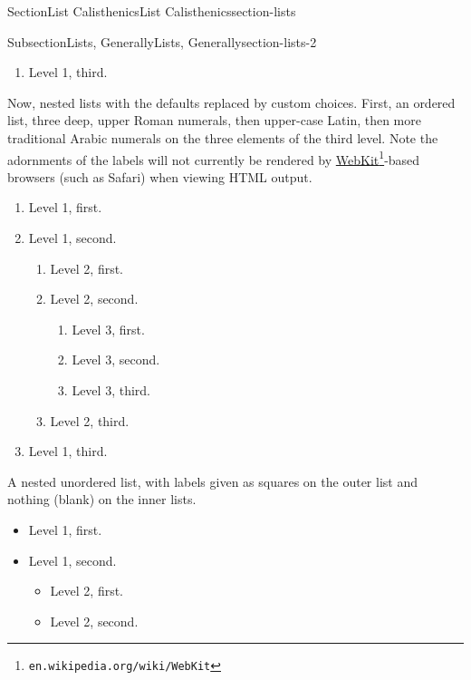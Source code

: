 \documentclass[twoside,10pt,]{article}
\numberwithin{equation}{section}
\begin{document}
\begin{sectionptx}{Section}{List Calisthenics}{}{List Calisthenics}{}{}{section-lists}
\begin{subsectionptx}{Subsection}{Lists, Generally}{}{Lists, Generally}{}{}{section-lists-2}
\begin{enumerate}
\begin{enumerate}
\begin{itemize}[label=\textbullet]
\begin{enumerate}
\begin{enumerate}
\end{enumerate}
%
\item{}Level 4, third.%
\end{enumerate}
%
\item{}Level 3, third.%
\end{itemize}
%
\item{}Level 2, third.%
\end{enumerate}
%
\item{}Level 1, third.%
\end{enumerate}
%
\par
Now, nested lists with the defaults replaced by custom choices.  First, an ordered list, three deep, upper Roman numerals, then upper-case Latin, then more traditional Arabic numerals on the three elements of the third level.  Note the adornments of the labels will not currently be rendered by \href{https://en.wikipedia.org/wiki/WebKit}{WebKit}\footnote{\nolinkurl{en.wikipedia.org/wiki/WebKit}\label{section-lists-2-13-2}}-based browsers (such as Safari) when viewing HTML output.%
\begin{enumerate}[label={*\Roman**}]
\item{}Level 1, first.%
\item{}Level 1, second.%
\begin{enumerate}[label={++\Alph*}]
\item{}Level 2, first.%
\item{}Level 2, second.%
\begin{enumerate}[label={\arabic*)}]
\item{}Level 3, first.%
\item{}Level 3, second.%
\item{}Level 3, third.%
\end{enumerate}
%
\item{}Level 2, third.%
\end{enumerate}
%
\item{}Level 1, third.%
\end{enumerate}
%
\par
A nested unordered list, with labels given as squares on the outer list and nothing (blank) on the inner lists.%
\begin{itemize}[label=$\blacksquare$]
\item{}Level 1, first.%
\item{}Level 1, second.%
\begin{itemize}[label=]
\item{}Level 2, first.%
\item{}Level 2, second.%

\end{itemize}
\end{itemize}
\end{subsectionptx}
\end{sectionptx}
\end{document}
